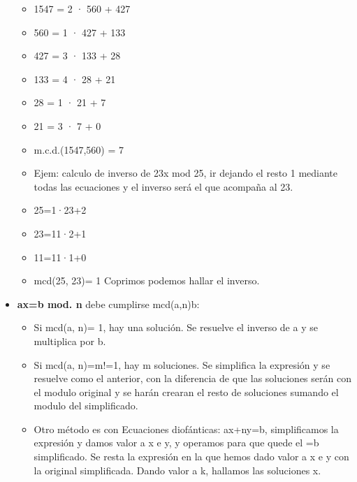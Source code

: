 \documentclass[12pt, twoside, openright]{report} %
\begin{document}
\begin{itemize}
\begin{itemize}
    \item 1547 = 2 · 560 + 427
      
    \item 560 = 1 · 427 + 133
      
    \item 427 = 3 · 133 + 28
      
    \item 133 = 4 · 28 + 21
      
    \item 28 = 1 · 21 + 7
      
    \item 21 = 3 · 7 + 0
      
    \item m.c.d.(1547,560) = 7
      
    \item Ejem: calculo de inverso de 23x mod 25, ir dejando el resto 1
      mediante todas las ecuaciones y el inverso será el que acompaña al
      23.
      
    \item 25=1·23+2
      
    \item 23=11·2+1
      
    \item 11=11·1+0
      
    \item mcd(25, 23)= 1 Coprimos podemos hallar el inverso.
      
    \end{itemize}
  \item \textbf{ax=b mod. n} debe cumplirse mcd(a,n)\textbar b:
    

    \begin{itemize}
    \item Si mcd(a, n)= 1, hay una solución. Se resuelve el inverso de a y
      se multiplica por b.
      
    \item Si mcd(a, n)=m!=1, hay m soluciones. Se simplifica la expresión y
      se resuelve como el anterior, con la diferencia de que las
      soluciones serán con el modulo original y se harán crearan el
      resto de soluciones sumando el modulo del simplificado.
      
    \item Otro método es con Ecuaciones diofánticas: ax+ny=b, simplificamos
      la expresión y damos valor a x e y, y operamos para que quede el
      =b simplificado. Se resta la expresión en la que hemos dado valor
      a x e y con la original simplificada. Dando valor a k, hallamos
      las soluciones x.
      

\end{itemize}
\end{itemize}
\end{document}
